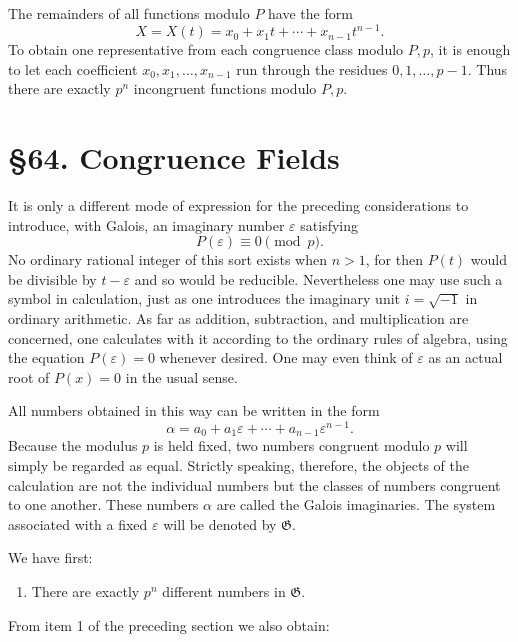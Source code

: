\documentclass[11pt]{article}
\newcommand{\webersection}[2]{\section*{\S #1. #2}\addcontentsline{toc}{section}{\S #1. #2}}
\begin{document}
The remainders of all functions modulo \(P\) have the form
\begin{equation}\label{eq:63-7}
 X=X(t)=x_0+x_1t+\cdots+x_{n-1}t^{n-1}.
\end{equation}
To obtain one representative from each congruence class modulo \(P,p\), it is enough to let each coefficient \(x_0,x_1,\ldots,x_{n-1}\) run through the residues \(0,1,\ldots,p-1\).  Thus there are exactly \(p^n\) incongruent functions modulo \(P,p\).

\webersection{64}{Congruence Fields}

It is only a different mode of expression for the preceding considerations to introduce, with Galois, an imaginary number \(\varepsilon\) satisfying
\begin{equation}\label{eq:64-1}
 P(\varepsilon)\equiv0\pmod p.
\end{equation}
No ordinary rational integer of this sort exists when \(n>1\), for then \(P(t)\) would be divisible by \(t-\varepsilon\) and so would be reducible.  Nevertheless one may use such a symbol in calculation, just as one introduces the imaginary unit \(i=\sqrt{-1}\) in ordinary arithmetic.  As far as addition, subtraction, and multiplication are concerned, one calculates with it according to the ordinary rules of algebra, using the equation \(P(\varepsilon)=0\) whenever desired.  One may even think of \(\varepsilon\) as an actual root of \(P(x)=0\) in the usual sense.

All numbers obtained in this way can be written in the form
\begin{equation}\label{eq:64-2}
 \alpha=a_0+a_1\varepsilon+\cdots+a_{n-1}\varepsilon^{n-1}.
\end{equation}
Because the modulus \(p\) is held fixed, two numbers congruent modulo \(p\) will simply be regarded as equal.  Strictly speaking, therefore, the objects of the calculation are not the individual numbers but the classes of numbers congruent to one another.  These numbers \(\alpha\) are called the Galois imaginaries.  The system associated with a fixed \(\varepsilon\) will be denoted by \(\mathfrak G\).

We have first:

\begin{enumerate}[label=\arabic*.,resume]
\item There are exactly \(p^n\) different numbers in \(\mathfrak G\).
\end{enumerate}
From item 1 of the preceding section we also obtain:
\end{document}
